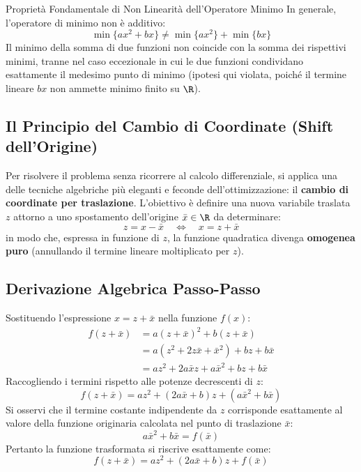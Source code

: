 \begin{alertblock}{Propriet\`a Fondamentale di Non Linearit\`a dell'Operatore Minimo}
In generale, l'operatore di minimo non \`e additivo:
\begin{equation}
\min \{ ax^2 + bx \} \neq \min \{ ax^2 \} + \min \{ bx \}
\end{equation}
Il minimo della somma di due funzioni non coincide con la somma dei rispettivi minimi, tranne nel caso eccezionale in cui le due funzioni condividano esattamente il medesimo punto di minimo (ipotesi qui violata, poich\'e il termine lineare $bx$ non ammette minimo finito su $\R$).
\end{alertblock}

\subsection{Il Principio del Cambio di Coordinate (Shift dell'Origine)}
Per risolvere il problema senza ricorrere al calcolo differenziale, si applica una delle tecniche algebriche pi\`u eleganti e feconde dell'ottimizzazione: il \textbf{cambio di coordinate per traslazione}.
L'obiettivo \`e definire una nuova variabile traslata $z$ attorno a uno spostamento dell'origine $\bar{x} \in \R$ da determinare:
\begin{equation}
z = x - \bar{x} \quad \Longleftrightarrow \quad x = z + \bar{x}
\end{equation}
in modo che, espressa in funzione di $z$, la funzione quadratica divenga \textbf{omogenea puro} (annullando il termine lineare moltiplicato per $z$).

\subsection{Derivazione Algebrica Passo-Passo}
Sostituendo l'espressione $x = z + \bar{x}$ nella funzione $f(x)$:
\begin{align}
f(z + \bar{x}) &= a(z + \bar{x})^2 + b(z + \bar{x}) \nonumber\\
&= a\left(z^2 + 2z\bar{x} + \bar{x}^2\right) + bz + b\bar{x} \nonumber\\
&= az^2 + 2a\bar{x}z + a\bar{x}^2 + bz + b\bar{x}
\end{align}
Raccogliendo i termini rispetto alle potenze decrescenti di $z$:
\begin{equation}
f(z + \bar{x}) = az^2 + (2a\bar{x} + b)z + \left(a\bar{x}^2 + b\bar{x}\right)
\end{equation}
Si osservi che il termine costante indipendente da $z$ corrisponde esattamente al valore della funzione originaria calcolata nel punto di traslazione $\bar{x}$:
\begin{equation}
a\bar{x}^2 + b\bar{x} = f(\bar{x})
\end{equation}
Pertanto la funzione trasformata si riscrive esattamente come:
\begin{equation}
f(z + \bar{x}) = az^2 + (2a\bar{x} + b)z + f(\bar{x})
\end{equation}

